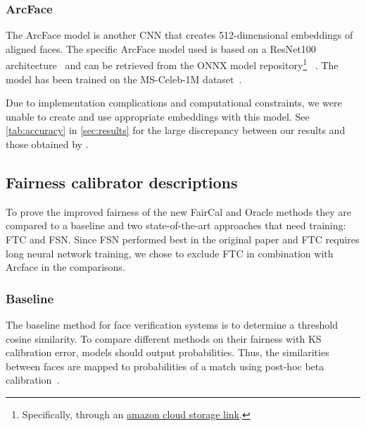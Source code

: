 \subsubsection{ArcFace}
The ArcFace model is another CNN that creates 512-dimensional embeddings of aligned faces.
The specific ArcFace model used is %
based on a ResNet100 architecture~\cite{He_2016_CVPRresnet100}
and can be retrieved from the ONNX model repository\footnote{Specifically, through an \href{https://s3.amazonaws.com/onnx-model-zoo/arcface/resnet100.onnx}{amazon cloud storage link}.}%
~\cite{salvador_2021arcface}.
The model has been trained on the MS-Celeb-1M dataset~\cite{10.1007/978-3-319-46487-9_6msceleb1}.%

Due to implementation complications and computational constraints, we were unable to create and use appropriate embeddings with this model.
See \autoref{tab:accuracy} in \autoref{sec:results} for the large discrepancy between our results and those obtained by \citeauthor{salvador2022faircal}.

\subsection{Fairness calibrator descriptions}

To prove the improved fairness of the new FairCal and Oracle methods they are compared to a baseline and two state-of-the-art approaches that need training: FTC and FSN. 
Since FSN performed best in the original paper and FTC requires long neural network training, we chose to exclude FTC in combination with Arcface in the comparisons.

\subsubsection{Baseline}
The baseline method for face verification systems is to determine a threshold cosine similarity.
To compare different methods on their fairness with KS calibration error, models should output probabilities.
Thus, the similarities between faces are mapped to probabilities of a match using post-hoc beta calibration~\cite{patel2021multiclass-betacalibration}.

